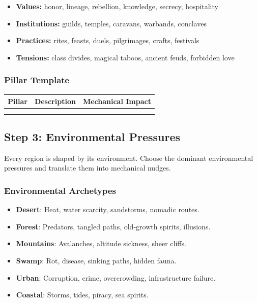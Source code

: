 \documentclass[11pt]{article}
\begin{document}
\begin{itemize}
    \item \textbf{Values:} honor, lineage, rebellion, knowledge, secrecy, hospitality
    \item \textbf{Institutions:} guilds, temples, caravans, warbands, conclaves
    \item \textbf{Practices:} rites, feasts, duels, pilgrimages, crafts, festivals
    \item \textbf{Tensions:} class divides, magical taboos, ancient feuds, forbidden love
\end{itemize}

\subsubsection{Pillar Template}
\begin{center}
\begin{longtable}{|p{3cm}|p{6cm}|p{4cm}|}
\hline
\textbf{Pillar} & \textbf{Description} & \textbf{Mechanical Impact} \\
\hline
\phantom{Pillar} & & \\
\phantom{Pillar} & & \\
\hline
\end{longtable}
\end{center}

\subsection{Step 3: Environmental Pressures}

Every region is shaped by its environment. Choose the dominant environmental pressures and 
translate them into mechanical nudges.

\subsubsection{Environmental Archetypes}
\begin{itemize}
    \item \textbf{Desert}: Heat, water scarcity, sandstorms, nomadic routes.
    \item \textbf{Forest}: Predators, tangled paths, old-growth spirits, illusions.
    \item \textbf{Mountains}: Avalanches, altitude sickness, sheer cliffs.
    \item \textbf{Swamp}: Rot, disease, sinking paths, hidden fauna.
    \item \textbf{Urban}: Corruption, crime, overcrowding, infrastructure failure.
    \item \textbf{Coastal}: Storms, tides, piracy, sea spirits.
\end{itemize}
\end{document}
